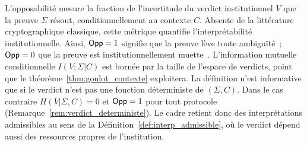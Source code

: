 \begin{sloppypar}
L'opposabilit\'e mesure la fraction de l'incertitude du verdict
institutionnel $V$ que la preuve $\Sigma$ r\'esout, conditionnellement
au contexte $C$. Absente de la litt\'erature cryptographique
classique, cette m\'etrique quantifie
l'interpr\'etabilit\'e institutionnelle. Ainsi, $\mathsf{Opp} = 1$ signifie que la preuve
l\`eve toute ambigu\"it\'e~; $\mathsf{Opp} = 0$ que la preuve est institutionnellement
muette~\cite{Zohar15,Grimmelmann15}. L'information mutuelle conditionnelle $I(V;\Sigma|C)$ est born\'ee
par la taille de l'espace de verdicts, point que le th\'eor\`eme~\ref{thm:goulot_contexte}
exploitera. La d\'efinition n'est informative que si le verdict n'est pas une
fonction d\'eterministe de $(\Sigma,C)$. Dans le cas contraire $H(V|\Sigma,C)=0$ et
$\mathsf{Opp}=1$ pour tout protocole (Remarque~\ref{rem:verdict_deterministe}). Le
cadre retient donc des interpr\'etations admissibles au sens de la
D\'efinition~\ref{def:interp_admissible}, o\`u le verdict d\'epend aussi des
ressources propres de l'institution.

\end{sloppypar}

